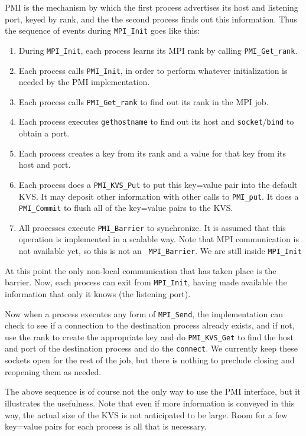 \documentclass[11pt]{article}
\begin{document}
PMI is the mechanism by which the first process advertises its host and
listening port, keyed by rank, and the the second process finds out this
information.  Thus the sequence of events during {\tt MPI\_Init} goes
like this:
\begin{enumerate}
\item During {\tt MPI\_Init}, each process learns its MPI rank by calling
  {\tt PMI\_Get\_rank}.
\item Each process calls {\tt PMI\_Init}, in order to perform whatever
  initialization is needed by the PMI implementation.
\item Each process calls {\tt PMI\_Get\_rank} to find out its rank in
  the MPI job.
\item Each process executes {\tt gethostname} to find out its host and
  {\tt socket}/{\tt bind} to obtain a port.
\item Each process creates a key from its rank and a value for that key
  from its host and port.
\item Each process does a {\tt PMI\_KVS\_Put} to put this key=value pair into
  the default KVS.  It may deposit other information with other calls to
  {\tt PMI\_put}.  It does a {\tt PMI\_Commit} to flush all of the
  key=value pairs to the KVS.
\item All processes execute {\tt PMI\_Barrier} to synchronize.  It is
  assumed that this operation is implemented in a scalable way.  Note
  that MPI communication is not available yet, so this is not an {\tt
    MPI\_Barrier}.  We are still inside {\tt MPI\_Init}
\end{enumerate}
At this point the only non-local communication that has taken place is
the barrier.  Now, each process can exit from {\tt MPI\_Init}, having
made available the information that only it knows (the listening port).

Now when a process executes any form of {\tt MPI\_Send}, the
implementation can check to see if a connection to the destination
process already exists, and if not, use the rank to create the
appropriate key and do {\tt PMI\_KVS\_Get} to find the host and port of the
destination process and do the {\tt connect}.  We currently keep these
sockets open for the rest of the job, but there is nothing to preclude
closing and reopening them as needed.

The above sequence is of course not the only way to use the PMI
interface, but it illustrates the usefulness.  Note that even if more
information is conveyed in this way, the actual size of the KVS is not
anticipated to be large.  Room for a few key=value pairs for each
process is all that is necessary.
\end{document}
